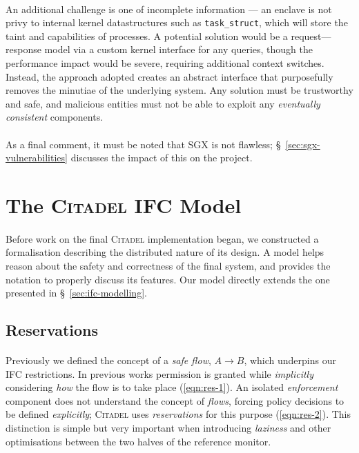 \paragraph{} An additional challenge is one of incomplete information --- an enclave is not privy to internal kernel datastructures such as \texttt{task\_struct}, which will store the taint and capabilities of processes. A potential solution would be a request---response model via a custom kernel interface for any queries, though the performance impact would be severe, requiring additional context switches. Instead, the approach adopted creates an abstract interface that purposefully removes the minutiae of the underlying system. Any solution must be trustworthy and safe, and malicious entities must not be able to exploit any \textit{eventually consistent} components.~\cite{10.1145/1435417.1435432}

\paragraph{} As a final comment, it must be noted that SGX is not flawless; §~\ref{sec:sgx-vulnerabilities} discusses the impact of this on the project.



\section{The \textsc{Citadel} IFC Model}

\paragraph{} Before work on the final \textsc{Citadel} implementation began, we constructed a formalisation describing the distributed nature of its design. A model helps reason about the safety and correctness of the final system, and provides the notation to properly discuss its features. Our model directly extends the one presented in §~\ref{sec:ifc-modelling}.

\subsection{Reservations}

\paragraph{} Previously we defined the concept of a \textit{safe flow}, $A \rightarrow B$, which underpins our IFC restrictions. In previous works permission is granted while \textit{implicitly} considering \textit{how} the flow is to take place (\ref{eqn:res-1}). An isolated \textit{enforcement} component does not understand the concept of \textit{flows}, forcing policy decisions to be defined \textit{explicitly}; \textsc{Citadel} uses \textit{reservations} for this purpose (\ref{eqn:res-2}). This distinction is simple but very important when introducing \textit{laziness} and other optimisations between the two halves of the reference monitor.

